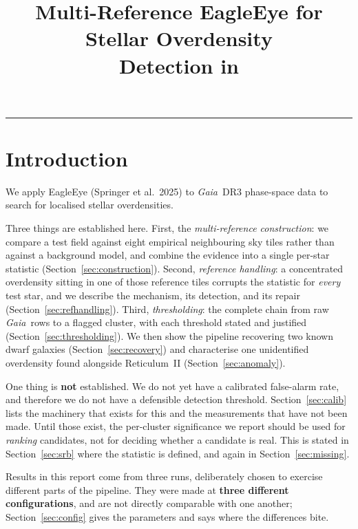 \documentclass[11pt,a4paper]{article}
\title{\bfseries Multi-Reference EagleEye for Stellar Overdensity\\
       Detection in \Gaia }
\author{}
\date{}
\newcommand{\Gaia}{\textit{Gaia}}
\begin{document}
\maketitle
\vspace{-3.2em}


\tableofcontents
\bigskip
\hrule

\section{Introduction}
\label{sec:purpose}

We apply EagleEye (Springer et al.\ 2025) to \Gaia\ DR3 phase-space
data to search for localised stellar overdensities.

Three things are established here. First, the \emph{multi-reference construction}: we compare a
test field against eight empirical neighbouring sky tiles rather than against a background model,
and combine the evidence into a single per-star statistic (Section~\ref{sec:construction}).
Second, \emph{reference handling}: a concentrated overdensity sitting in one of those reference
tiles corrupts the statistic for \emph{every} test star, and we describe the mechanism, its
detection, and its repair (Section~\ref{sec:refhandling}). Third, \emph{thresholding}: the
complete chain from raw \Gaia\ rows to a flagged cluster, with each threshold stated and justified
(Section~\ref{sec:thresholding}). We then show the pipeline recovering two known dwarf galaxies
(Section~\ref{sec:recovery}) and characterise one unidentified overdensity found alongside
Reticulum~II (Section~\ref{sec:anomaly}).

One thing is \textbf{not} established. We do not yet have a calibrated false-alarm rate, and
therefore we do not have a defensible detection threshold. Section~\ref{sec:calib} lists the
machinery that exists for this and the measurements that have not been made. Until those exist,
the per-cluster significance we report should be used for \emph{ranking} candidates, not for
deciding whether a candidate is real. This is stated in Section~\ref{sec:srb} where the statistic
is defined, and again in Section~\ref{sec:missing}.

Results in this report come from three runs, deliberately chosen to exercise different parts of
the pipeline. They were made at \textbf{three different configurations}, and are not directly
comparable with one another; Section~\ref{sec:config} gives the parameters and says where the
differences bite.
\end{document}
